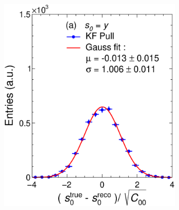 \begin{figure}[t]
     \centering
     \begin{subfigure}{0.32\textwidth}
         \centering
         \includegraphics[width=\textwidth]{figures/ch4-KF_NDGArLite/Toy/Corr/UnitKFEnd_p0.eps}
         \caption{}
         \label{fig:resp0KF_GArLite_Corr}
     \end{subfigure}
     \begin{subfigure}{0.32\textwidth}
         \centering

\end{subfigure}
\end{figure}
